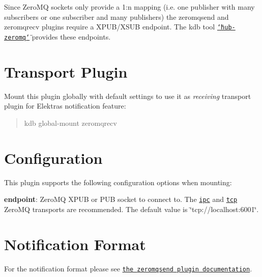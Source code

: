 Since Zero\+MQ sockets only provide a 1\+:n mapping (i.\+e. one publisher with many subscribers or one subscriber and many publishers) the {\ttfamily zeromqsend} and {\ttfamily zeromqrecv} plugins require a X\+P\+U\+B/\+X\+S\+UB endpoint. The kdb tool \href{https://www.libelektra.org/tools/hub-zeromq}{\tt \char`\"{}hub-\/zeromq\char`\"{}} provides these endpoints.

\section*{Transport Plugin}

Mount this plugin globally with default settings to use it as {\itshape receiving} transport plugin for Elektra\textquotesingle{}s notification feature\+:

\begin{quote}
kdb global-\/mount zeromqrecv \end{quote}


\section*{Configuration}

This plugin supports the following configuration options when mounting\+:


\begin{DoxyItemize}
\item {\bfseries endpoint}\+: Zero\+MQ X\+P\+UB or P\+UB socket to connect to. The \href{http://api.zeromq.org/4-2:zmq-ipc}{\tt {\ttfamily ipc}} and \href{http://api.zeromq.org/4-2:zmq-tcp}{\tt {\ttfamily tcp}} Zero\+MQ transports are recommended. The default value is \char`\"{}tcp\+://localhost\+:6001\char`\"{}.
\end{DoxyItemize}

\section*{Notification Format}

For the notification format please see \href{https://www.libelektra.org/plugins/zeromqsend#notification-format}{\tt the {\ttfamily zeromqsend} plugin documentation}. 